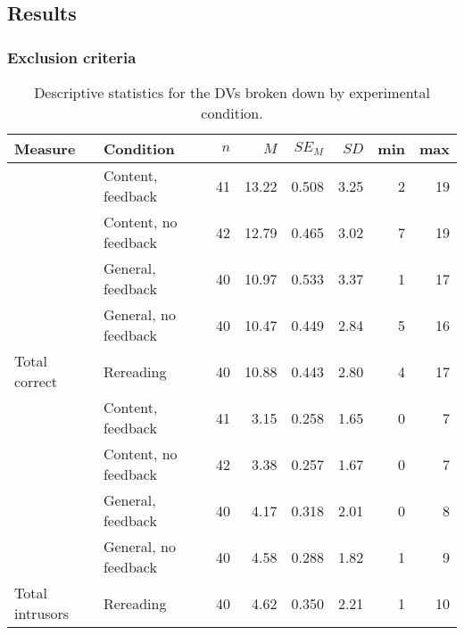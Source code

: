 \documentclass[11pt,]{article}
\title{}
\author{}
\date{}
\begin{document}
\hypertarget{results}{%
\subsection{Results}\label{results}}

\hypertarget{exclusion-criteria}{%
\subsubsection{Exclusion criteria}\label{exclusion-criteria}}

\begin{table*}[t]

\caption{\label{tab:descTable}\label{descTable}Descriptive statistics for the DVs broken down
                     by experimental condition.}
\centering
\begin{tabular}{llrrrrrr}
\toprule
Measure & Condition & $n$ & $M$ & $SE_M$ & $SD$ & min & max\\
\midrule
 & Content, feedback & 41 & 13.22 & 0.508 & 3.25 & 2 & 19\\

 & Content, no feedback & 42 & 12.79 & 0.465 & 3.02 & 7 & 19\\

 & General, feedback & 40 & 10.97 & 0.533 & 3.37 & 1 & 17\\

 & General, no feedback & 40 & 10.47 & 0.449 & 2.84 & 5 & 16\\

\multirow{-5}{*}{\raggedright\arraybackslash Total correct} & Rereading & 40 & 10.88 & 0.443 & 2.80 & 4 & 17\\
\cmidrule{1-8}
 & Content, feedback & 41 & 3.15 & 0.258 & 1.65 & 0 & 7\\

 & Content, no feedback & 42 & 3.38 & 0.257 & 1.67 & 0 & 7\\

 & General, feedback & 40 & 4.17 & 0.318 & 2.01 & 0 & 8\\

 & General, no feedback & 40 & 4.58 & 0.288 & 1.82 & 1 & 9\\

\multirow{-5}{*}{\raggedright\arraybackslash Total intrusors} & Rereading & 40 & 4.62 & 0.350 & 2.21 & 1 & 10\\
\bottomrule
\end{tabular}
\end{table*}
\end{document}
